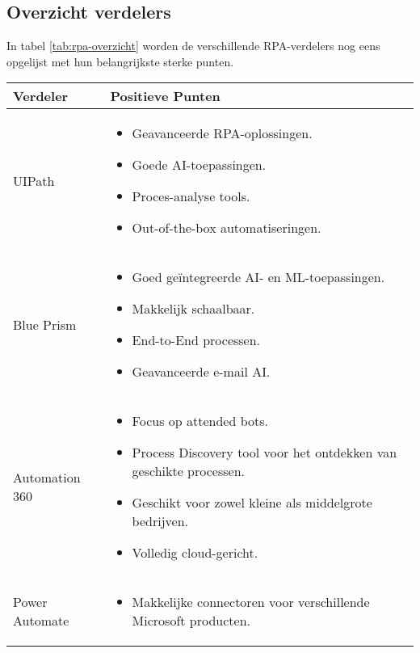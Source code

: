 \subsection{Overzicht verdelers}
\label{subsec:overzicht-verdelers}

In tabel \ref{tab:rpa-overzicht} worden de verschillende RPA-verdelers nog eens opgelijst met hun belangrijkste sterke punten.

\begin{longtable}{|p{3cm}|p{12cm}|}
    \hline
    \textbf{Verdeler} & \textbf{Positieve Punten} \\
    \hline
    UIPath & \begin{itemize}[left=0pt]
                \item Geavanceerde RPA-oplossingen.
                \item Goede AI-toepassingen.
                \item Proces-analyse tools.
                \item Out-of-the-box automatiseringen.
            \end{itemize} \\
    \hline
    Blue Prism & \begin{itemize}[left=0pt]
                    \item Goed geïntegreerde AI- en ML-toepassingen.
                    \item Makkelijk schaalbaar.
                    \item End-to-End processen.
                    \item Geavanceerde e-mail AI.
                \end{itemize} \\
    \hline
    Automation 360 & \begin{itemize}[left=0pt]
                        \item Focus op attended bots.
                        \item Process Discovery tool voor het ontdekken van geschikte processen.
                        \item Geschikt voor zowel kleine als middelgrote bedrijven.
                        \item Volledig cloud-gericht.
                    \end{itemize} \\
    \hline
    Power Automate & \begin{itemize}[left=0pt]
                        \item Makkelijke connectoren voor verschillende Microsoft producten.

\end{itemize}
\end{longtable}
